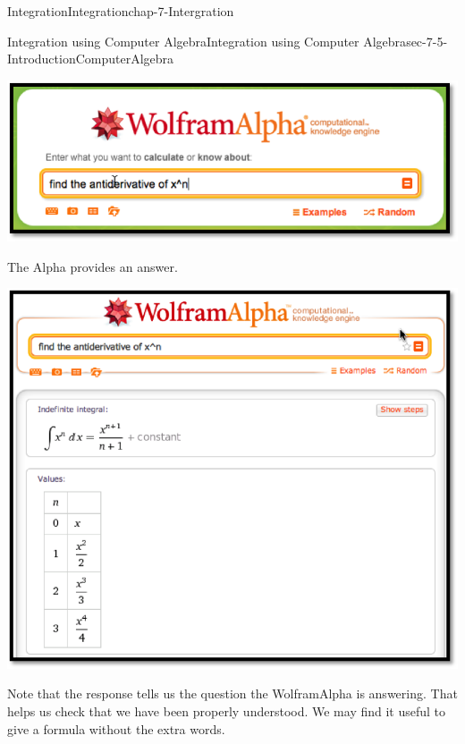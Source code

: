 \documentclass[oneside,10pt,]{book}
\numberwithin{equation}{section}
\begin{document}
\begin{chapterptx}{Integration}{}{Integration}{}{}{chap-7-Intergration}
\begin{sectionptx}{Integration using Computer Algebra}{}{Integration using Computer Algebra}{}{}{sec-7-5-IntroductionComputerAlgebra}
\begin{sidebyside}{1}{0.15}{0.15}{0}%
\begin{sbspanel}{0.7}%
\includegraphics[width=1\linewidth]{images/sec7-5-1.png}
\end{sbspanel}%
\end{sidebyside}%
\par
\hypertarget{p-2883}{}%
The Alpha provides an answer.%
\begin{sidebyside}{1}{0.15}{0.15}{0}%
\begin{sbspanel}{0.7}%
\includegraphics[width=1\linewidth]{images/sec7-5-2.png}
\end{sbspanel}%
\end{sidebyside}%
\par
\hypertarget{p-2884}{}%
Note that the response tells us the question the Wolfram\textbar{}Alpha is answering.  That helps us check that we have been properly understood.  We may find it useful to give a formula without the extra words.%
\begin{sidebyside}{1}{0.15}{0.15}{0}%

\end{sidebyside}
\end{sectionptx}
\end{chapterptx}
\end{document}
